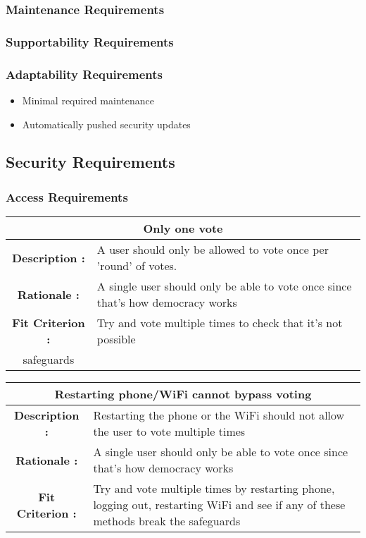 \documentclass[12pt, titlepage]{article}
\begin{document}
\subsubsection{Maintenance Requirements}
\subsubsection{Supportability Requirements}
\subsubsection{Adaptability Requirements}
\begin{itemize}
\item Minimal required maintenance
\item Automatically pushed security updates
\end{itemize}

\subsection{Security Requirements}
\subsubsection{Access Requirements}

\begin{center}
\begin{table}[H]
\begin{tabularx}{\textwidth}{| c X |}
\hline
\multicolumn{2}{|c|}{\textbf{Only one vote}}\\
\hline
\textbf{Description : } & A user should only be allowed to vote once per 'round'
of votes.\\
\hline
\textbf{Rationale : } & A single user should only be able to vote once since
that's how democracy works\\
\hline
\textbf{Fit Criterion : } & Try and vote multiple times to check that it's not
possible\\
safeguards\\
\hline
\end{tabularx}
\end{table}
\end{center}

\begin{center}
\begin{table}[H]
\begin{tabularx}{\textwidth}{| c X |}
\hline
\multicolumn{2}{|c|}{\textbf{Restarting phone/WiFi cannot bypass voting}}\\
\hline
\textbf{Description : } & Restarting the phone or the WiFi should not allow
the user to vote multiple times\\
\hline
\textbf{Rationale : } & A single user should only be able to vote once since
that's how democracy works\\
\hline
\textbf{Fit Criterion : } & Try and vote multiple times by restarting phone,
logging out, restarting WiFi and see if any of these methods break the
safeguards\\
\hline
\end{tabularx}
\end{table}
\end{center}
\end{document}
